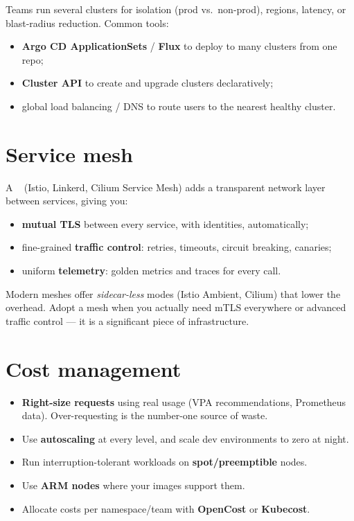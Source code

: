 Teams run several clusters for isolation (prod vs.\ non-prod), regions, latency,
or blast-radius reduction. Common tools:

\begin{itemize}
  \item \textbf{Argo CD ApplicationSets} / \textbf{Flux} to deploy to many clusters from one repo;
  \item \textbf{Cluster API} to create and upgrade clusters declaratively;
  \item global load balancing / DNS to route users to the nearest healthy cluster.
\end{itemize}

\section{Service mesh}

A ~ (Istio, Linkerd, Cilium Service Mesh) adds
a transparent network layer between services, giving you:

\begin{itemize}
  \item \textbf{mutual TLS} between every service, with identities, automatically;
  \item fine-grained \textbf{traffic control}: retries, timeouts, circuit breaking, canaries;
  \item uniform \textbf{telemetry}: golden metrics and traces for every call.
\end{itemize}

Modern meshes offer \emph{sidecar-less} modes (Istio Ambient, Cilium) that lower
the overhead. Adopt a mesh when you actually need mTLS everywhere or advanced
traffic control --- it is a significant piece of infrastructure.

\section{Cost management}

\begin{itemize}
  \item \textbf{Right-size requests} using real usage (VPA recommendations,
        Prometheus data). Over-requesting is the number-one source of waste.
  \item Use \textbf{autoscaling} at every level, and scale dev environments to zero at night.
  \item Run interruption-tolerant workloads on \textbf{spot/preemptible} nodes.
  \item Use \textbf{ARM nodes} where your images support them.
  \item Allocate costs per namespace/team with \textbf{OpenCost} or \textbf{Kubecost}.
\end{itemize}

